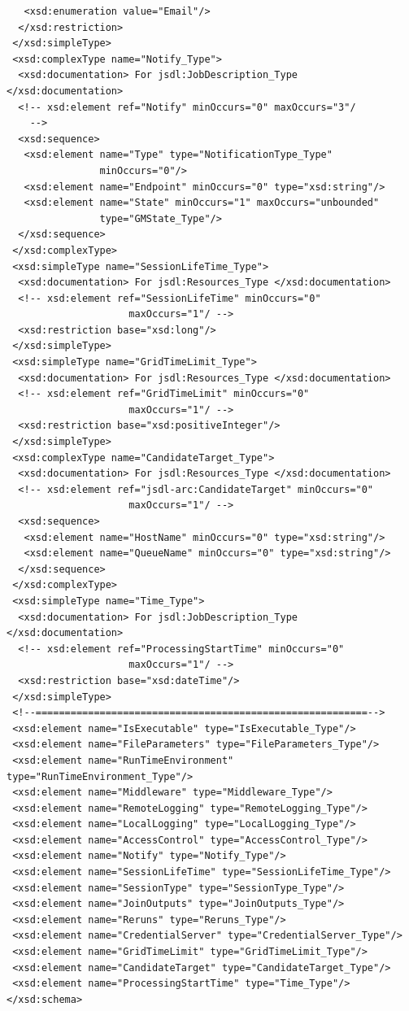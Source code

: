 \documentclass{article}                            %
\begin{document}
\begin{footnotesize}
\begin{verbatim}
   <xsd:enumeration value="Email"/>
  </xsd:restriction>
 </xsd:simpleType>
 <xsd:complexType name="Notify_Type">
  <xsd:documentation> For jsdl:JobDescription_Type </xsd:documentation>
  <!-- xsd:element ref="Notify" minOccurs="0" maxOccurs="3"/
    -->
  <xsd:sequence>
   <xsd:element name="Type" type="NotificationType_Type"
                minOccurs="0"/>
   <xsd:element name="Endpoint" minOccurs="0" type="xsd:string"/>
   <xsd:element name="State" minOccurs="1" maxOccurs="unbounded"
                type="GMState_Type"/>
  </xsd:sequence>
 </xsd:complexType>
 <xsd:simpleType name="SessionLifeTime_Type">
  <xsd:documentation> For jsdl:Resources_Type </xsd:documentation>
  <!-- xsd:element ref="SessionLifeTime" minOccurs="0"
                     maxOccurs="1"/ -->
  <xsd:restriction base="xsd:long"/>
 </xsd:simpleType>
 <xsd:simpleType name="GridTimeLimit_Type">
  <xsd:documentation> For jsdl:Resources_Type </xsd:documentation>
  <!-- xsd:element ref="GridTimeLimit" minOccurs="0"
                     maxOccurs="1"/ -->
  <xsd:restriction base="xsd:positiveInteger"/>
 </xsd:simpleType>
 <xsd:complexType name="CandidateTarget_Type">
  <xsd:documentation> For jsdl:Resources_Type </xsd:documentation>
  <!-- xsd:element ref="jsdl-arc:CandidateTarget" minOccurs="0"
                     maxOccurs="1"/ -->
  <xsd:sequence>
   <xsd:element name="HostName" minOccurs="0" type="xsd:string"/>
   <xsd:element name="QueueName" minOccurs="0" type="xsd:string"/>
  </xsd:sequence>
 </xsd:complexType>
 <xsd:simpleType name="Time_Type">
  <xsd:documentation> For jsdl:JobDescription_Type </xsd:documentation>
  <!-- xsd:element ref="ProcessingStartTime" minOccurs="0"
                     maxOccurs="1"/ -->
  <xsd:restriction base="xsd:dateTime"/>
 </xsd:simpleType>
 <!--=========================================================-->
 <xsd:element name="IsExecutable" type="IsExecutable_Type"/>
 <xsd:element name="FileParameters" type="FileParameters_Type"/>
 <xsd:element name="RunTimeEnvironment" type="RunTimeEnvironment_Type"/>
 <xsd:element name="Middleware" type="Middleware_Type"/>
 <xsd:element name="RemoteLogging" type="RemoteLogging_Type"/>
 <xsd:element name="LocalLogging" type="LocalLogging_Type"/>
 <xsd:element name="AccessControl" type="AccessControl_Type"/>
 <xsd:element name="Notify" type="Notify_Type"/>
 <xsd:element name="SessionLifeTime" type="SessionLifeTime_Type"/>
 <xsd:element name="SessionType" type="SessionType_Type"/>
 <xsd:element name="JoinOutputs" type="JoinOutputs_Type"/>
 <xsd:element name="Reruns" type="Reruns_Type"/>
 <xsd:element name="CredentialServer" type="CredentialServer_Type"/>
 <xsd:element name="GridTimeLimit" type="GridTimeLimit_Type"/>
 <xsd:element name="CandidateTarget" type="CandidateTarget_Type"/>
 <xsd:element name="ProcessingStartTime" type="Time_Type"/>
</xsd:schema>
\end{verbatim}
\end{footnotesize}
\end{document}
